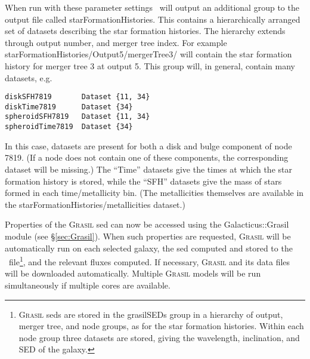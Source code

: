 When run with these parameter settings \glc\ will output an additional group to the output file called {\normalfont \ttfamily starFormationHistories}. This contains a hierarchically arranged set of datasets describing the star formation histories. The hierarchy extends through output number, and merger tree index. For example {\normalfont \ttfamily starFormationHistories/Output5/mergerTree3/} will contain the star formation history for merger tree 3 at output 5. This group will, in general, contain many datasets, e.g.
\begin{verbatim}
diskSFH7819       Dataset {11, 34}
diskTime7819      Dataset {34}
spheroidSFH7819   Dataset {11, 34}
spheroidTime7819  Dataset {34}
\end{verbatim}
In this case, datasets are present for both a disk and bulge component of node 7819. (If a node does not contain one of these components, the corresponding dataset will be missing.) The ``{\normalfont \ttfamily Time}'' datasets give the times at which the star formation history is stored, while the ``{\normalfont \ttfamily SFH}'' datasets give the mass of stars formed in each time/metallicity bin. (The metallicities themselves are available in the {\normalfont \ttfamily starFormationHistories/metallicities} dataset.)

Properties of the {\normalfont \scshape Grasil} \gls{sed} can now be accessed using the {\normalfont \ttfamily Galacticus::Grasil} module (see \S\ref{sec:Grasil}). When such properties are requested, {\normalfont \scshape Grasil} will be automatically run on each selected galaxy, the \gls{sed} computed and stored to the \glc\ file\footnote{{\normalfont \scshape Grasil} \glspl{sed} are stored in the {\normalfont \ttfamily grasilSEDs} group in a hierarchy of output, merger tree, and node groups, as for the star formation histories. Within each node group three datasets are stored, giving the {\normalfont \ttfamily wavelength}, {\normalfont \ttfamily inclination}, and {\normalfont \ttfamily SED} of the galaxy.}, and the relevant fluxes computed. If necessary, {\normalfont \scshape Grasil} and its data files will be downloaded automatically. Multiple {\normalfont \scshape Grasil} models will be run simultaneously if multiple cores are available.

